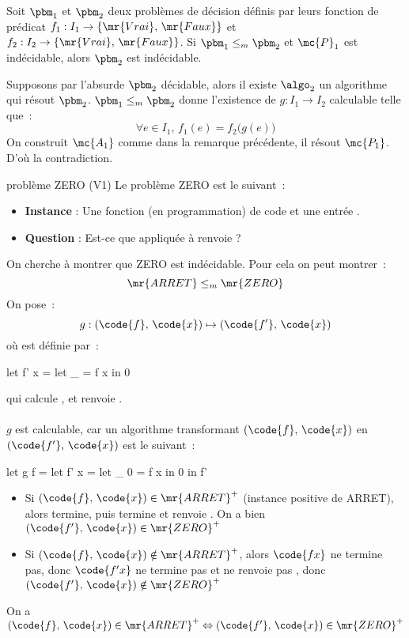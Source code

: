 \begin{proposition}{}{}
    Soit $\pbm_1$ et $\pbm_2$ deux problèmes de décision définis par leurs fonction de prédicat $f_1 : I_1 \to \{\mr{Vrai},\, \mr{Faux}\}$ et $f_2 : I_2 \to \{\mr{Vrai},\, \mr{Faux}\}$. Si $\pbm_1 \leq_m \pbm_2$ et $\mc{P}_1$ est indécidable, alors $\pbm_2$ est indécidable.
\end{proposition}

\begin{demonstration}
    Supposons par l'absurde $\pbm_2$ décidable, alors il existe $\algo_2$ un algorithme qui résout $\pbm_2$. $\pbm_1 \leq_m \pbm_2$ donne l'existence de $g : I_1 \to I_2$ calculable telle que~:
    $$\forall e \in I_1,\, f_1(e) = f_2\Big(g(e)\Big)$$
    On construit $\mc{A_1}$ comme dans la remarque précédente, il résout $\mc{P_1}$. D'où la contradiction.
\end{demonstration}

\begin{exemple}{}{problème ZERO (V1)}
    Le problème ZERO est le suivant~:
    \begin{itemize}
        \item \textbf{Instance} : Une fonction (en programmation)  de code  et une entrée .
        \item \textbf{Question} : Est-ce que  appliquée à  renvoie  ?
    \end{itemize}
    On cherche à montrer que ZERO est indécidable. Pour cela on peut montrer~:
    $$\mr{ARRET} \leq_m \mr{ZERO}$$
    On pose~:
    $$g : (\code{f},\, \code{x}) \mapsto (\code{f'},\, \code{x})$$
    où  est définie par~:
    \begin{lstLNat}
    let f' x = let _ = f x in 0
    \end{lstLNat}
    qui calcule , et renvoie .\\\\

    $g$ est calculable, car un algorithme transformant $(\code{f},\, \code{x})$ en $(\code{f'},\, \code{x})$ est le suivant~:
    \begin{lstLNat}
    let g f =
        let f' x = let _ 0 = f x in 0
        in f'
    \end{lstLNat}
    \begin{itemize}
        \item Si $(\code{f},\, \code{x}) \in \mr{ARRET}^+$ (instance positive de ARRET), alors  termine, puis  termine et renvoie . On a bien $(\code{f'},\, \code{x}) \in \mr{ZERO}^+$
        \item Si $(\code{f},\, \code{x}) \notin \mr{ARRET}^+$, alors $\code{f x}$ ne termine pas, donc $\code{f' x}$ ne termine pas et ne renvoie pas , donc $(\code{f'},\, \code{x}) \notin \mr{ZERO}^+$
    \end{itemize}
    On a $(\code{f},\, \code{x}) \in \mr{ARRET}^+ \Leftrightarrow (\code{f'},\, \code{x}) \in \mr{ZERO}^+$
\end{exemple}

